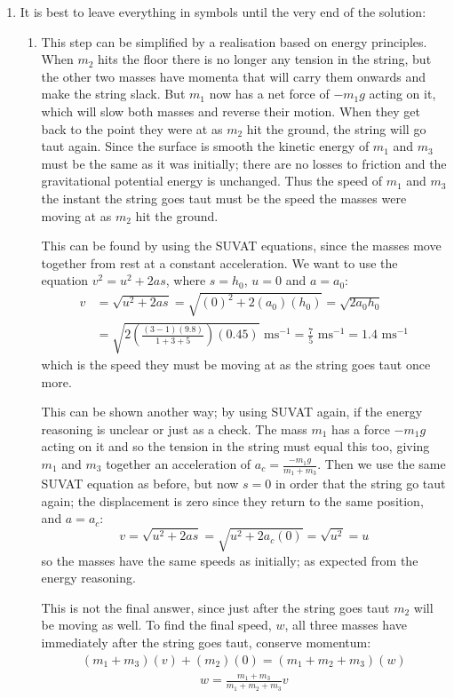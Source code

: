 \begin{problem}[A1969AMIIQ2a]
{\begin{enumerate}
is the initial acceleration.
	\item It is best to leave everything in symbols until the very end of the solution:
	\begin{enumerate}
		\item This step can be simplified by a realisation based on energy principles. When $m_{2}$ hits the floor there is no longer any tension in the string, but the other two masses have momenta that will carry them onwards and make the string slack. But $m_{1}$ now has a net force of $-m_{1}g$ acting on it, which will slow both masses and reverse their motion. When they get back to the point they were at as $m_{2}$ hit the ground, the string will go taut again. Since the surface is smooth the kinetic energy of $m_{1}$ and $m_{3}$ must be the same as it was initially; there are no losses to friction and the gravitational potential energy is unchanged. Thus the speed of $m_{1}$ and $m_{3}$ the instant the string goes taut must be the speed the masses were moving at as $m_{2}$ hit the ground.

This can be found by using the SUVAT equations, since the masses move together from rest at a constant acceleration. We want to use the equation $v^{2} = u^{2} + 2as$, where $s = h_{0}$, $u = 0$ and $a = a_{0}$:
\begin{align*} 
v &= \sqrt{u^{2} + 2as} = \sqrt{(0)^{2} + 2(a_{0})(h_{0})} = \sqrt{2a_{0}h_{0}} \\
 &= \sqrt{2\left(\frac{(3 - 1)(9.8)}{1 + 3 + 5}\right)(0.45)} \text{ ms}^{-1} = \frac{7}{5} \text{ ms}^{-1} = 1.4 \text{ ms}^{-1}  
 \end{align*}
which is the speed they must be moving at as the string goes taut once more. 

This can be shown another way; by using SUVAT again, if the energy reasoning is unclear or just as a check. The mass $m_{1}$ has a force $-m_{1}g$ acting on it and so the tension in the string must equal this too, giving $m_{1}$ and $m_{3}$ together an acceleration of $a_{c} = \frac{-m_{1}g}{m_{1} + m_{3}}$. Then we use the same SUVAT equation as before, but now $s = 0$ in order that the string go taut again; the displacement is zero since they return to the same position, and $a = a_{c}$:
\begin{equation*} 
v = \sqrt{u^{2} + 2as} = \sqrt{u^{2} + 2a_{c}(0)} = \sqrt{u^{2}} = u 
\end{equation*}
so the masses have the same speeds as initially; as expected from the energy reasoning.

This is not the final answer, since just after the string goes taut $m_{2}$ will be moving as well. To find the final speed, $w$, all three masses have immediately after the string goes taut, conserve momentum:
\begin{align*} 
(m_{1} + m_{3})(v) + (m_{2})(0) = (m_{1} + m_{2} + m_{3})(w) 
\end{align*}
\begin{align*}
 w = \frac{m_{1} + m_{3}}{m_{1} + m_{2} + m_{3}} v 
 \end{align*}


\end{enumerate}
\end{enumerate}}
\end{problem}
